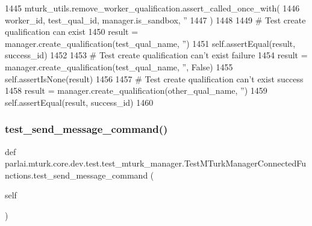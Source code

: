\begin{DoxyCode}
1445         mturk\_utils.remove\_worker\_qualification.assert\_called\_once\_with(
1446             worker\_id, test\_qual\_id, manager.is\_sandbox, \textcolor{stringliteral}{''}
1447         )
1448 
1449         \textcolor{comment}{# Test create qualification can exist}
1450         result = manager.create\_qualification(test\_qual\_name, \textcolor{stringliteral}{''})
1451         self.assertEqual(result, success\_id)
1452 
1453         \textcolor{comment}{# Test create qualification can't exist failure}
1454         result = manager.create\_qualification(test\_qual\_name, \textcolor{stringliteral}{''}, \textcolor{keyword}{False})
1455         self.assertIsNone(result)
1456 
1457         \textcolor{comment}{# Test create qualification can't exist success}
1458         result = manager.create\_qualification(other\_qual\_name, \textcolor{stringliteral}{''})
1459         self.assertEqual(result, success\_id)
1460 
\end{DoxyCode}
\mbox{\label{classparlai_1_1mturk_1_1core_1_1dev_1_1test_1_1test__mturk__manager_1_1TestMTurkManagerConnectedFunctions_af52a75550f8ece0ef60c6efefef85846}} 
\subsubsection{\texorpdfstring{test\+\_\+send\+\_\+message\+\_\+command()}{test\_send\_message\_command()}}
{\footnotesize\ttfamily def parlai.\+mturk.\+core.\+dev.\+test.\+test\+\_\+mturk\+\_\+manager.\+Test\+M\+Turk\+Manager\+Connected\+Functions.\+test\+\_\+send\+\_\+message\+\_\+command (\begin{DoxyParamCaption}\item[{}]{self }\end{DoxyParamCaption})}



